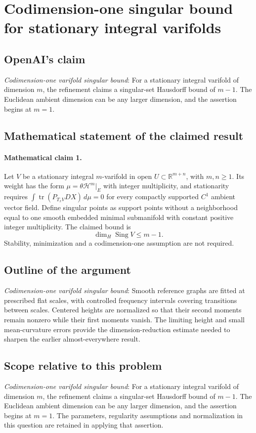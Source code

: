 \documentclass[11pt]{article}
\begin{document}
\section*{Codimension-one singular bound for stationary integral varifolds}

\subsection{OpenAI's claim}
\textit{Codimension-one varifold singular bound}: For a stationary integral varifold of dimension $m$, the refinement claims a singular-set Hausdorff bound of $m-1$. The Euclidean ambient dimension can be any larger dimension, and the assertion begins at $m=1$.

\subsection{Mathematical statement of the claimed result}
\paragraph{Mathematical claim 1.} Let $V$ be a stationary integral $m$-varifold in open $U\subset\mathbb R^{m+n}$, with $m,n\ge1$. Its weight has the form $\mu=\theta\mathcal H^m|_E$ with integer multiplicity, and stationarity requires $\int\operatorname{tr}(P_{T_xV}DX)\,d\mu=0$ for every compactly supported $C^1$ ambient vector field. Define singular points as support points without a neighborhood equal to one smooth embedded minimal submanifold with constant positive integer multiplicity. The claimed bound is \[\dim_H\operatorname{Sing}V\le m-1.\] Stability, minimization and a codimension-one assumption are not required.

\subsection{Outline of the argument}
\textit{Codimension-one varifold singular bound}: Smooth reference graphs are fitted at prescribed flat scales, with controlled frequency intervals covering transitions between scales. Centered heights are normalized so that their second moments remain nonzero while their first moments vanish. The limiting height and small mean-curvature errors provide the dimension-reduction estimate needed to sharpen the earlier almost-everywhere result.

\subsection{Scope relative to this problem}
\textit{Codimension-one varifold singular bound}: For a stationary integral varifold of dimension $m$, the refinement claims a singular-set Hausdorff bound of $m-1$. The Euclidean ambient dimension can be any larger dimension, and the assertion begins at $m=1$. The parameters, regularity assumptions and normalization in this question are retained in applying that assertion.
\end{document}
